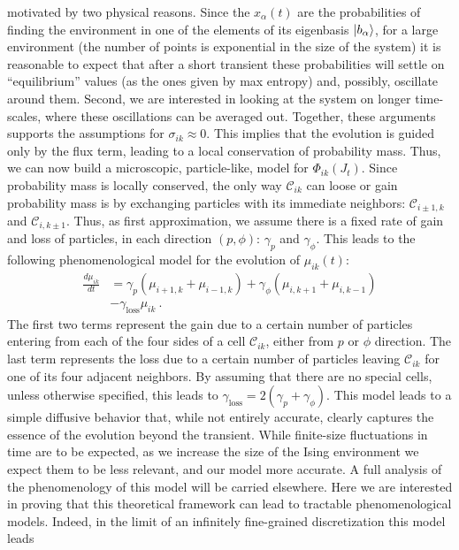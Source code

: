 \documentclass[draft,nofootinbib,pre,twocolumn,showpacs,showkeys,preprintnumbers,floatfix]{revtex4-1}
\newcommand{\CC}[2]{\mathcal{C}_{#1 #2}}
\newcommand{\1}{\mathbbm{1}}
\begin{document}
motivated by two physical reasons. Since the $x_\alpha(t)$ are the probabilities of 
finding the environment in one of the elements of its eigenbasis $\ket{b_\alpha}$, 
for a large environment (the number of points is exponential in the size of the system) 
it is reasonable to expect that after a short transient these probabilities will settle on 
``equilibrium'' values (as the ones given by max entropy) and, possibly, oscillate 
around them. Second, we are interested in looking at the system on longer time-scales, 
where these oscillations can be averaged out. Together, these arguments supports the
assumptions for $\sigma_{ik}\approx 0$. This implies that the evolution is guided only 
by the flux term, leading to a local conservation of probability mass. Thus, we can 
now build a microscopic, particle-like, model for $\Phi_{ik}(J_t)$.
Since probability mass is locally conserved, the only way $\CC{i}{k}$ can loose or 
gain probability mass is by exchanging particles with its immediate neighbors: $\CC{i\pm1,}{k}$ and $\CC{i,}{k\pm1}$. 
Thus, as first approximation, we assume there is a fixed rate of gain and loss of particles,
in each direction $(p,\phi)$: $\gamma_p$ and $\gamma_{\phi}$. This leads to 
the following phenomenological model for the evolution of $\mu_{ik}(t)$:
\begin{align}
\frac{d\mu_{ik}}{dt} &= \gamma_p \left( \mu_{i+1,k} + \mu_{i-1,k}\right) +\gamma_{\phi} \left( \mu_{i,k+1} + \mu_{i,k-1}\right) \nonumber \\
&- \gamma_{\mathrm{loss}}\mu_{ik}~.
\end{align}
The first two terms represent the gain due to a certain number of particles entering 
from each of the four sides of a cell $\mathcal{C}_{ik}$, either from $p$ or $\phi$ direction. 
The last term represents the loss due to a certain number of particles leaving $\CC{i}{k}$ 
for one of its four adjacent neighbors. By assuming that there are no special cells, unless otherwise 
specified, this leads to $\gamma_{\mathrm{loss}} = 2(\gamma_p+\gamma_{\phi})$.
This model leads to a simple diffusive behavior that, while not entirely accurate, 
clearly captures the essence of the evolution beyond the transient. While finite-size
fluctuations in time are to be expected, as we increase the size of the Ising environment
we expect them to be less relevant, and our model more accurate. A full analysis of 
the phenomenology of this model will be carried elsewhere. Here we are interested 
in proving that this theoretical framework can lead to tractable phenomenological 
models. Indeed, in the limit of an infinitely fine-grained discretization this model leads 
\end{document}

